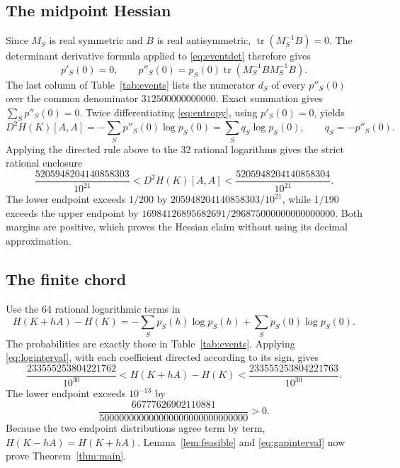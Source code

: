 \documentclass[11pt]{article}
\newcommand{\tr}{\operatorname{tr}}
\begin{document}
\subsection{The midpoint Hessian}

Since $M_S$ is real symmetric and $B$ is real antisymmetric,
$\tr(M_S^{-1}B)=0$.  The determinant derivative formula applied to
\eqref{eq:eventdet} therefore gives
\begin{equation}\label{eq:pderivatives}
 p'_S(0)=0,
 \qquad
 p''_S(0)=p_S(0)\tr(M_S^{-1}B M_S^{-1}B).
\end{equation}
The last column of Table~\ref{tab:events} lists the numerator $d_S$ of every
$p''_S(0)$ over the common denominator $312500000000000$.  Exact summation gives
$\sum_Sp''_S(0)=0$.  Twice differentiating \eqref{eq:entropy}, using
$p'_S(0)=0$, yields
\begin{equation}\label{eq:hessianlogs}
 D^2H(K)[A,A]
 =-\sum_Sp''_S(0)\log p_S(0)
 =\sum_Sq_S\log p_S(0),
 \qquad q_S=-p''_S(0).
\end{equation}
Applying the directed rule above to the 32 rational logarithms gives the strict
rational enclosure
\begin{equation}\label{eq:hessianinterval}
 \frac{5205948204140858303}{10^{21}}
 <D^2H(K)[A,A]<
 \frac{5205948204140858304}{10^{21}}.
\end{equation}
The lower endpoint exceeds $1/200$ by
$205948204140858303/10^{21}$, while $1/190$ exceeds the upper endpoint by
$16984126895682691/296875000000000000000$.  Both margins are positive, which
proves the Hessian claim without using its decimal approximation.

\subsection{The finite chord}

Use the 64 rational logarithmic terms in
\begin{equation}\label{eq:gaplogs}
 H(K+hA)-H(K)
 =-\sum_S p_S(h)\log p_S(h)
  +\sum_S p_S(0)\log p_S(0).
\end{equation}
The probabilities are exactly those in Table~\ref{tab:events}.  Applying
\eqref{eq:loginterval}, with each coefficient directed according to its sign,
gives
\begin{equation}\label{eq:gapinterval}
 \frac{233555253804221762}{10^{30}}
 <H(K+hA)-H(K)<
 \frac{233555253804221763}{10^{30}}.
\end{equation}
The lower endpoint exceeds $10^{-13}$ by
\[
 \frac{66777626902110881}
 {500000000000000000000000000000}>0.
\]
Because the two endpoint distributions agree term by term,
$H(K-hA)=H(K+hA)$.  Lemma~\ref{lem:feasible} and
\eqref{eq:gapinterval} now prove Theorem~\ref{thm:main}.
\end{document}
